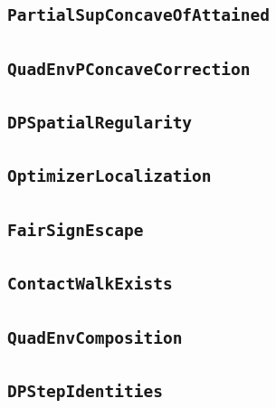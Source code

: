 \documentclass[11pt]{amsart}
\theoremstyle{definition}
\begin{document}
\subsection{\texorpdfstring{\texttt{PartialSupConcaveOfAttained}}{PartialSupConcaveOfAttained}}\label{node:PartialSupConcaveOfAttained}


\subsection{\texorpdfstring{\texttt{QuadEnvPConcaveCorrection}}{QuadEnvPConcaveCorrection}}\label{node:QuadEnvPConcaveCorrection}


\subsection{\texorpdfstring{\texttt{DPSpatialRegularity}}{DPSpatialRegularity}}\label{node:DPSpatialRegularity}


\subsection{\texorpdfstring{\texttt{OptimizerLocalization}}{OptimizerLocalization}}\label{node:OptimizerLocalization}


\subsection{\texorpdfstring{\texttt{FairSignEscape}}{FairSignEscape}}\label{node:FairSignEscape}


\subsection{\texorpdfstring{\texttt{ContactWalkExists}}{ContactWalkExists}}\label{node:ContactWalkExists}


\subsection{\texorpdfstring{\texttt{QuadEnvComposition}}{QuadEnvComposition}}\label{node:QuadEnvComposition}


\subsection{\texorpdfstring{\texttt{DPStepIdentities}}{DPStepIdentities}}\label{node:DPStepIdentities}

\end{document}
